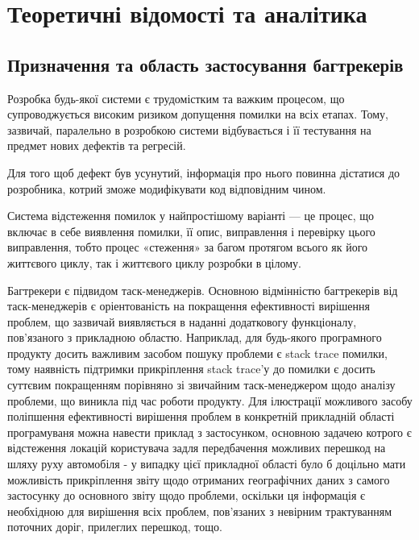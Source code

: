 \documentclass[../main.tex]{subfiles}
\begin{document}
\chapter{Теоретичні відомості та аналітика}

\section{Призначення та область застосування багтрекерів}

Розробка будь-якої системи є трудомістким та важким процесом, що супроводжується високим ризиком допущення помилки на всіх етапах. Тому, зазвичай, паралельно в розробкою системи відбувається і її тестування на предмет нових дефектів та регресій.

Для того щоб дефект був усунутий, інформація про нього повинна дістатися до розробника, котрий зможе модифікувати код відповідним чином.

Система відстеження помилок у найпростішому варіанті — це процес, що включає в себе виявлення помилки, її опис, виправлення і перевірку цього виправлення, тобто процес «стеження» за багом протягом всього як його життєвого циклу, так і життєвого циклу розробки в цілому.\cite{bugtracking_systems}

Багтрекери є підвидом таск-менеджерів. Основною відмінністю багтрекерів від таск-менеджерів є  оріентованість на покращення ефективності вирішення проблем, що зазвичай виявляється в наданні додатковогу функціоналу, пов'язаного з прикладною областю. Наприклад, для будь-якого програмного продукту досить важливим засобом пошуку проблеми є stack trace помилки, тому наявність підтримки прикріплення stack trace'у до помилки є досить суттєвим покращенням порівняно зі звичайним таск-менеджером щодо аналізу проблеми, що виникла під час роботи продукту. Для ілюстрації можливого засобу поліпшення ефективності вирішення проблем в конкретній прикладній області програмуваня можна навести приклад з застосунком, основною задачею котрого є відстеження локацій користувача задля передбачення можливих перешкод на шляху руху автомобіля - у випадку цієї прикладної області було б доцільно мати можливість прикріплення звіту щодо отриманих географічних даних з самого застосунку до основного звіту щодо проблеми, оскільки ця інформація є необхідною для вирішення всіх проблем, пов'язаних з невірним трактуванням поточних доріг, прилеглих перешкод, тощо.
\end{document}
